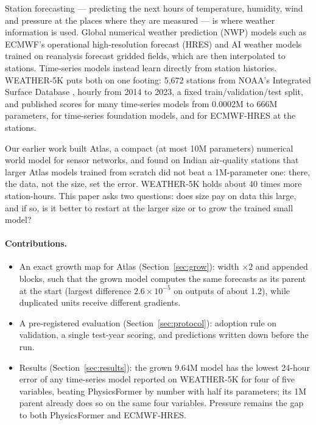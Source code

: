 \documentclass{article}
\begin{document}
Station forecasting --- predicting the next hours of temperature, humidity, wind and pressure at the places where
they are measured --- is where weather information is used. Global numerical weather prediction (NWP) models such as
ECMWF's operational high-resolution forecast (HRES) and AI weather models trained on reanalysis
\citep{lam2023graphcast,bi2023pangu} forecast gridded fields, which are then interpolated to stations. Time-series
models instead learn directly from station histories. WEATHER-5K \citep{han2026weather5k} puts both on one footing:
5,672 stations from NOAA's Integrated Surface Database \citep{smith2011isd}, hourly from 2014 to 2023, a fixed
train/validation/test split, and published scores for many time-series models from 0.0002M to 666M parameters, for
time-series foundation models, and for ECMWF-HRES at the stations.

Our earlier work built Atlas, a compact (at most 10M parameters) numerical world model for sensor networks, and found on
Indian air-quality stations that larger Atlas models trained from scratch did not beat a 1M-parameter one: there, the
data, not the size, set the error. WEATHER-5K holds about 40 times more
station-hours. This paper asks two questions: does size pay on data this large, and if so, is it better to restart at
the larger size or to grow the trained small model?

\paragraph{Contributions.}
\begin{itemize}
\item An exact growth map for Atlas (Section~\ref{sec:grow}): width $\times2$ and appended blocks, such that the grown
model computes the same forecasts as its parent at the start (largest difference $2.6\times10^{-5}$ on outputs of about
1.2), while duplicated units receive different gradients.
\item A pre-registered evaluation (Section~\ref{sec:protocol}): adoption rule on validation, a single test-year scoring,
and predictions written down before the run.
\item Results (Section~\ref{sec:results}): the grown 9.64M model has the lowest 24-hour error of any time-series model
reported on WEATHER-5K for four of five variables, beating PhysicsFormer by number with half its parameters; its
1M parent already does so on the same four variables. Pressure remains the gap to both PhysicsFormer and ECMWF-HRES.
\end{itemize}
\end{document}
